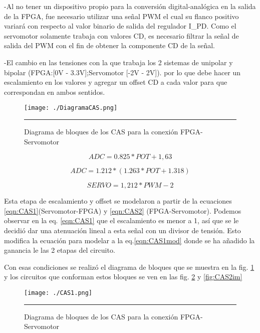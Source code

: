 \documentclass[12pt,a4paper]{article} %
\begin{document}
-Al no tener un dispositivo propio para la conversión digital-analógica en la salida de la FPGA, fue necesario utilizar una señal PWM el cual su flanco positivo variará con respecto al valor binario de salida del regulador I\_PD. Como el servomotor solamente trabaja con valores CD, es necesario filtrar la señal de salida del PWM con el fin de obtener la componente CD de la señal.

-El cambio en las tensiones con la que trabaja los 2 sistemas de unipolar y bipolar (FPGA:[0V - 3.3V];Servomotor [-2V - 2V]). por lo que debe hacer un escalamiento en los valores y agregar un offset CD a cada valor para que correspondan en ambos sentidos.

\begin{figure}[htbp]
  \centering
    \texttt{[image: ./DiagramaCAS.png]}
    \rule{35em}{0.5pt}
  \caption[CAS]{Diagrama de bloques de los CAS para la conexión FPGA-Servomotor}
  \label{fig:CAS}
\end{figure}

\begin{equation}\label{eqn:CAS1}
ADC=0.825*POT+1,63
\end{equation}

\begin{equation}\label{eqn:CAS1mod}
ADC=1.212*(1.263*POT+1.318)
\end{equation}

\begin{equation}\label{eqn:CAS2}
SERVO=1,212*PWM-2
\end{equation}

Esta etapa de escalamiento y offset se modelaron a partir de la ecuaciones \ref{eqn:CAS1}(Servomotor-FPGA) y \ref{eqn:CAS2} (FPGA-Servomotor). Podemos observar en la eq. \ref{eqn:CAS1} que el escalamiento es menor a 1, así que se le decidió dar una atenuación lineal a esta señal con un divisor de tensión. Esto modifica la ecuación para modelar a la eq.\ref{eqn:CAS1mod} donde se ha añadido la ganancia le las 2 etapas del circuito.

Con esas condiciones se realizó el diagrama de bloques que se muestra en la fig. \ref{fig:CAS} y los circuitos que conforman estos bloques se ven en las fig. \ref{fig:CAS1im} y \ref{fig:CAS2im}

\begin{figure}[htbp]
  \centering
    \texttt{[image: ./CAS1.png]}
    \rule{35em}{0.3pt}
  \caption[CAS1im]{Diagrama de bloques de los CAS para la conexión FPGA-Servomotor}
  \label{fig:CAS1im}
\end{figure}
\end{document}
